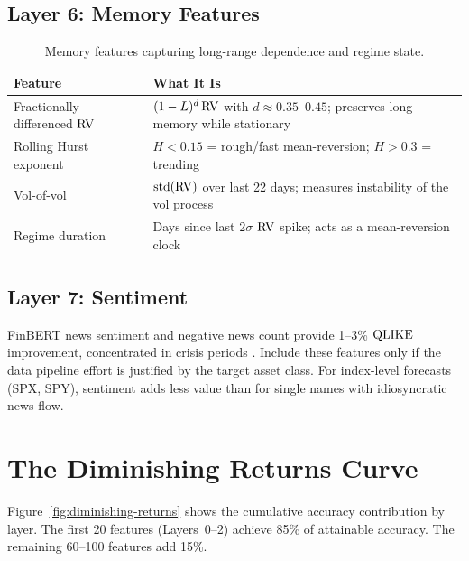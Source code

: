 \subsection*{Layer 6: Memory Features}

\begin{table}[htbp]
\centering
\caption{Memory features capturing long-range dependence and regime state.}
\label{tab:memory-features}
\small
\begin{tabular}{@{}p{4.2cm}p{9cm}@{}}
\toprule
\textbf{Feature} & \textbf{What It Is} \\
\midrule
Fractionally differenced $\operatorname{RV}$ &
  $(1-L)^d \operatorname{RV}$ with $d \approx 0.35$--$0.45$; preserves long memory while stationary \citep{LopezdePrado2018AFML} \\[4pt]
Rolling Hurst exponent &
  $H < 0.15$ = rough/fast mean-reversion; $H > 0.3$ = trending \citep{GJR2018} \\[4pt]
Vol-of-vol &
  $\operatorname{std}(\operatorname{RV})$ over last 22 days; measures instability of the vol process \\[4pt]
Regime duration &
  Days since last $2\sigma$ $\operatorname{RV}$ spike; acts as a mean-reversion clock \\
\bottomrule
\end{tabular}
\end{table}

\subsection*{Layer 7: Sentiment}

FinBERT news sentiment and negative news count provide 1--3\% $\operatorname{QLIKE}$ improvement, concentrated in crisis periods \citep{AudrinoSignristBallinari2020}.
Include these features only if the data pipeline effort is justified by the target asset class.
For index-level forecasts (SPX, SPY), sentiment adds less value than for single names with idiosyncratic news flow.


\section{The Diminishing Returns Curve}
\label{sec:diminishing-returns}

Figure~\ref{fig:diminishing-returns} shows the cumulative accuracy contribution by layer.
The first 20 features (Layers~0--2) achieve 85\% of attainable accuracy.
The remaining 60--100 features add 15\%.

